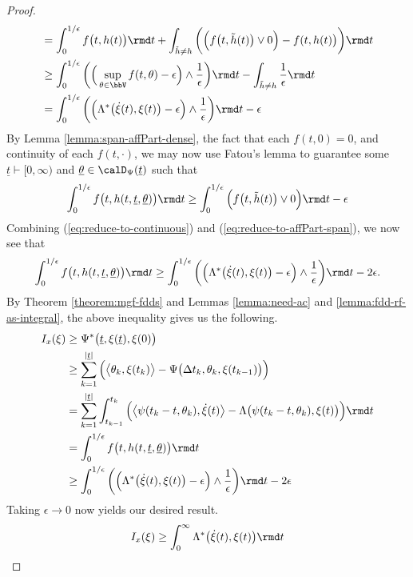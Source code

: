 \begin{proof}
\begin{align}
    \notag
    &= \int_0^{1/\epsilon}  f\big(t, \twistFunc(t)\big) \rmd t + \int_{\tilde\twistFunc\neq\twistFunc} \bigg(\Big( f\big(t, \tilde\twistFunc(t)\big) \vee 0 \Big) - f(t, \twistFunc(t)\big) \bigg)\rmd t \\
    \notag
    &\geq \int_0^{1/\epsilon}  \bigg( \Big( \sup_{\twistVar\in\vecSpace} f(t, \twistVar) - \epsilon \Big) \wedge \frac1\epsilon \bigg) \rmd t - \int_{\tilde\twistFunc\neq\twistFunc} \frac1\epsilon \rmd t \\
    &= \int_0^{1/\epsilon} \bigg( \Big( \ode^*\big(\dot\pathVar(t),\pathVar(t)\big) - \epsilon \Big) \wedge \frac1\epsilon \bigg) \rmd t - \epsilon
    \label{eq:reduce-to-continuous}
  \end{align}
  By Lemma \ref{lemma:span-affPart-dense}, the fact that each $f(t,0) = 0$, and continuity of each $f(t,\cdot)$, we may now use Fatou's lemma to guarantee some $\underline t \vdash [0,\infty)$ and $\underline\twistVar \in \momentSpace(\underline t)$ such that
  \begin{equation}
    \label{eq:reduce-to-affPart-span}
    \int_0^{1/\epsilon} f\big(t, \twistFunc(t, \underline t, \underline\twistVar)\big) \rmd t
    \geq \int_0^{1/\epsilon} \Big( f\big(t, \tilde\twistFunc(t)\big) \vee 0 \Big) \rmd t - \epsilon
  \end{equation}
  Combining (\ref{eq:reduce-to-continuous}) and (\ref{eq:reduce-to-affPart-span}), we now see that
  \begin{equation*}
    \int_0^{1/\epsilon} f\big(t, \twistFunc(t, \underline t, \underline\twistVar)\big) \rmd t 
    \geq \int_0^{1/\epsilon} \bigg( \Big( \ode^*\big(\dot\pathVar(t),\pathVar(t)\big) - \epsilon \Big) \wedge \frac1\epsilon \bigg) \rmd t - 2\epsilon.
  \end{equation*}
  By Theorem \ref{theorem:mgf-fdds} and Lemmas \ref{lemma:need-ac} and \ref{lemma:fdd-rf-as-integral}, the above inequality gives us the following.
  \begin{align*}
    \rf_\stateVar(\pathVar)
    &\geq \aff^*\big(\underline t, \pathVar(\underline t), \pathVar(0)\big) \\
    &\geq\sum_{k=1}^{|\underline t|} \Big( \bprj{\twistVar_k}{\pathVar(t_k)} - \aff\big(\Delta t_k, \twistVar_k, \pathVar(t_{k-1})\big) \Big) \\
    &=\sum_{k=1}^{|\underline t|} \int_{t_{k-1}}^{t_k} \Big( \bprj{\affPart(t_k-t,\twistVar_k)}{\dot\pathVar(t)} - \ode\big(\affPart(t_k-t, \twistVar_k), \pathVar(t)\big) \Big) \rmd t \\
    &= \int_0^{1/\epsilon} f\big( t, \twistFunc(t, \underline t, \underline\twistVar)\big) \rmd t \\
    &\geq \int_0^{1/\epsilon} \bigg( \Big( \ode^*\big(\dot\pathVar(t),\pathVar(t)\big) - \epsilon \Big) \wedge \frac1\epsilon \bigg) \rmd t - 2\epsilon
  \end{align*}
  Taking $\epsilon \rightarrow 0$ now yields our desired result.
  \begin{equation*}
    \rf_\stateVar(\pathVar) \geq \int_0^\infty \ode^*\big(\dot\pathVar(t), \pathVar(t)\big) \rmd t
  \end{equation*}
\end{proof}

